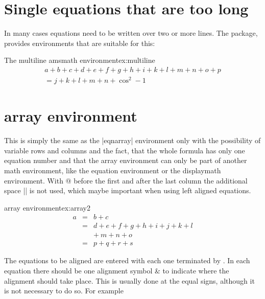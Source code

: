 \section{Single equations that are too long}

In many cases equations need to be written over two or more lines. The  package, provides environments that are suitable for this:


\begin{texexample}{The multiline amsmath environment}{ex:multiline}
\begin{multline}
   a + b + c + d + e + f+ g + h + i  + k + l + m + n + o + p\\
              = j + k + l + m + n +\cos^{2}-1
\end{multline}
\end{texexample}



\newpage


\section{array environment}

This is simply the same as the |eqnarray| environment only with the possibility of
variable rows and columns and the fact, that the whole formula has only one
equation number and that the array environment can only be part of another math
environment, like the equation environment or the displaymath environment. With
@{} before the first and after the last column the additional space |\arraycolsep| is
not used, which maybe important when using left aligned equations.

\begin{texexample}{array environment}{ex:array2}
\begin{eqnarray}
  a & = & b + c \\
    & = & d + e + f + g + h + i
               + j + k + l \nonumber \\
    && +\: m + n + o \\
   & = & p + q + r + s
\end{eqnarray}
\end{texexample}

The equations
to be aligned are entered with each one terminated by \doccmd{\cr}. In each equation there should be
one alignment symbol \& to indicate where the alignment should take place. This is usually
done at the equal signs, although it is not necessary to do so. For example



